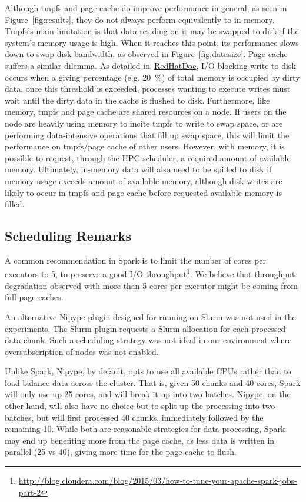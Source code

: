 \documentclass{IEEEtran}
\newcommand{\todo}[1]{\marginpar{\parbox{18mm}{\flushleft\tiny\color{red}\textbf{TODO}:
      #1}}}
\begin{document}
Although tmpfs and page cache do improve performance in general, as seen in
Figure~\ref{fig:results}, they do not always perform equivalently to in-memory. 
Tmpfs's main limitation is that data residing on it may be swapped to disk if 
the system's memory usage is high. When it reaches this point, its performance 
slows down to swap disk bandwidth, as observed in Figure~\ref{fig:datasize}. Page cache suffers a similar dilemma. As detailed
in~\href{https://access.redhat.com/documentation/en-us/red_hat_enterprise_linux/6/html/performance_tuning_guide/s-memory-tunables}{RedHatDoc}\todo{add to references},
I/O blocking write to disk occurs when a giving percentage (e.g. 20~\%) of total memory is occupied by dirty data, once this 
threshold is exceeded, processes wanting to execute writes must wait until the dirty data
in the cache is flushed to disk. Furthermore, like memory, tmpfs and page cache are shared resources on a node.
If users on the node are heavily using memory to incite tmpfs to write to swap space, or are performing data-intensive operations
that fill up swap space, this will limit the performance on tmpfs/page cache of other users. 
However, with memory, it is possible to request, through the HPC scheduler, a required
amount of available memory. Ultimately, in-memory data will also need to be spilled to
disk if memory usage exceeds amount of available memory, although disk writes are 
likely to occur in tmpfs and page cache before requested available memory is filled.

\subsection{Scheduling Remarks}

A common recommendation in Spark is to limit the number of cores per 
executors to 5, to preserve a good I/O 
throughput\footnote{\url{http://blog.cloudera.com/blog/2015/03/how-to-tune-your-apache-spark-jobs-part-2}}. 
We believe that throughput degradation observed with more than 5 cores 
per executor might be coming from full page caches.

An alternative Nipype plugin designed for running on Slurm was not used in the experiments.
The Slurm plugin requests a Slurm allocation for each processed data chunk. Such a
scheduling strategy was not ideal in our environment where oversubscription of nodes was 
not enabled.

Unlike Spark, Nipype, by default, opts to use all available CPUs rather than to load balance
data across the cluster. That is, given 50 chunks and 40 cores, Spark will only use up 25
cores, and will break it up into two batches. Nipype, on the other hand, will also have no 
choice but to split up the processing into two batches, but will first processed 40 chunks, 
immediately followed by the remaining 10. While both are reasonable strategies for 
data processing, Spark may end up benefiting more from the page cache, as less data is 
written in parallel (25 vs 40), giving more time for the page cache to flush.
\end{document}

